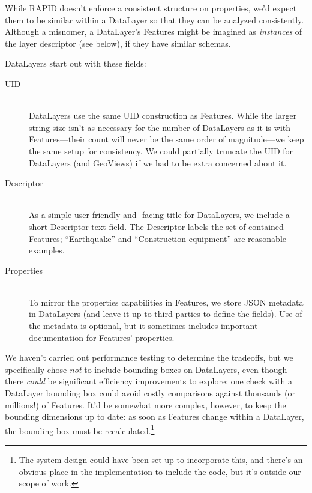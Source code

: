 While RAPID doesn't enforce a consistent structure on properties, we'd expect them to be similar within a DataLayer so that they can be analyzed consistently. Although a misnomer, a DataLayer's Features might be imagined as \textit{instances} of the layer descriptor (see below), if they have similar schemas.

DataLayers start out with these fields:

\begin{description}

\item[UID] \hfill \\
DataLayers use the same UID construction as Features. While the larger string size isn't as necessary for the number of DataLayers as it is with Features---their count will never be the same order of magnitude---we keep the same setup for consistency. We could partially truncate the UID for DataLayers (and GeoViews) if we had to be extra concerned about it.

\item[Descriptor] \hfill \\
As a simple user-friendly and -facing title for DataLayers, we include a short Descriptor text field. The Descriptor labels the set of contained Features; ``Earthquake'' and ``Construction equipment'' are reasonable examples.

\item[Properties] \hfill \\
To mirror the properties capabilities in Features, we store JSON metadata in DataLayers (and leave it up to third parties to define the fields). Use of the metadata is optional, but it sometimes includes important documentation for Features' properties.
  
\end{description}

 We haven't carried out performance testing to determine the tradeoffs, but we specifically chose \textit{not} to include bounding boxes on DataLayers, even though there \textit{could} be significant efficiency improvements to explore: one check with a DataLayer bounding box could avoid costly comparisons against thousands (or millions!) of Features. It'd be somewhat more complex, however, to keep the bounding dimensions up to date: as soon as Features change within a DataLayer, the bounding box must be recalculated.\footnote{The system design could have been set up to incorporate this, and there's an obvious place in the implementation to include the code, but it's outside our scope of work.}


